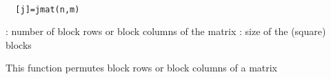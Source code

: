 
\begin{mandesc}
   \\ %
\end{mandesc}
\begin{calling_sequence}
\begin{verbatim}
  [j]=jmat(n,m)  
\end{verbatim}
\end{calling_sequence}
\begin{parameters}
  \begin{varlist}
    : number of block rows or block columns of the matrix
    : size of the (square) blocks
  \end{varlist}
\end{parameters}
\begin{mandescription}
  This function permutes block rows or block columns of a matrix
\end{mandescription}
